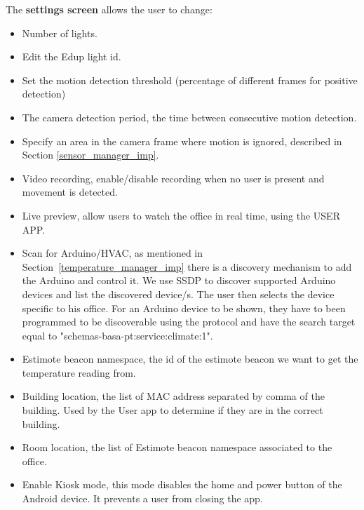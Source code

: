 The \textbf{settings screen} allows the user to change:
\begin{itemize}
  \item Number of lights.
  \item Edit the Edup light id.
  
  \item Set the motion detection threshold (percentage of different frames for positive detection)
  
  \item The camera detection period, the time between consecutive motion detection.
  
  \item Specify an area in the camera frame where motion is ignored, described in Section \ref{sensor_manager_imp}. 
  
  \item Video recording, enable/disable recording when no user is present and movement is detected.
  
  \item Live preview, allow users to watch the office in real time, using the USER APP.
  
  \item Scan for Arduino/HVAC, as mentioned in Section~\ref{temperature_manager_imp} there is a discovery mechanism to add the Arduino and control it. We use \ac{SSDP} to discover supported Arduino devices and list the discovered device/s. The user then selects the device specific to his office.
  For an Arduino device to be shown, they have to been programmed to be discoverable using the protocol and have the search target equal to "schemas-basa-pt:service:climate:1".
  
  \item Estimote beacon namespace, the id of the estimote beacon we want to get the temperature reading from.
  
  \item Building location, the list of \ac{MAC address} separated by comma of the building. Used by the User app to determine if they are in the correct building.
  
  \item Room location, the list of Estimote beacon namespace associated to the office.
  
  
  \item Enable Kiosk mode, this mode disables the home and power button of the Android device. It prevents a user from closing the app. 
    
  
\end{itemize}

